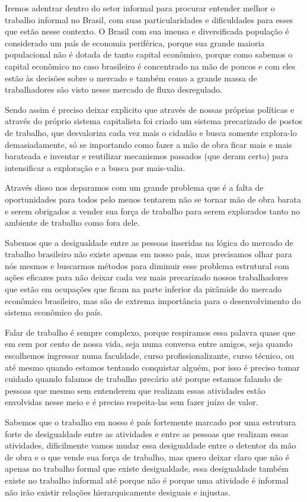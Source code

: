 Iremos adentrar dentro do setor informal para procurar entender melhor o trabalho informal no Brasil, com suas
particularidades e dificuldades para esses que estão nesse contexto. O Brasil com sua imensa e diversificada
população é considerado um país de economia periférica, porque sua grande maioria populacional não é dotada de 
tanto capital econômico, porque como sabemos o capital econômico no caso brasileiro é concentrado na mão de 
poucos e com eles estão às decisões sobre o mercado e também como a grande massa de trabalhadores são visto 
nesse mercado de fluxo desregulado. 

Sendo assim é preciso deixar explicito que através de nossas próprias 
políticas e através do próprio sistema capitalista foi criado um sistema precarizado de postos de trabalho, 
que desvaloriza cada vez mais o cidadão e busca somente explora-lo demasiadamente, só se importando como fazer 
a mão de obra ficar mais e mais barateada e inventar e reutilizar mecanismos passados (que deram certo) para 
intensificar a exploração e a busca por mais-valia. 

Através disso nos deparamos com um grande problema que é 
a falta de oportunidades para todos pelo menos tentarem não se tornar mão de obra barata e serem obrigados a 
vender sua força de trabalho para serem explorados tanto no ambiente de trabalho como fora dele.

Sabemos que a desigualdade entre as pessoas inseridas na lógica do mercado de trabalho brasileiro não existe 
apenas em nosso país, mas precisamos olhar para nós mesmos e buscarmos métodos para diminuir esse problema 
estrutural com ações eficazes para não deixar cada vez mais precarizado nossos trabalhadores que estão em 
ocupações que ficam na parte inferior da pirâmide do mercado econômico brasileiro, mas são de extrema 
importância para o desenvolvimento do sistema econômico do país. 

Falar de trabalho é sempre complexo, porque respiramos essa palavra quase que em cem por cento de nossa vida, 
seja numa conversa entre amigos, seja quando escolhemos ingressar numa faculdade, curso profissionalizante, 
curso técnico, ou até mesmo quando estamos tentando conquistar alguém, por isso é preciso tomar cuidado quando 
falamos de trabalho precário até porque estamos falando de pessoas que mesmo sem entenderem que realizam essas 
atividades estão envolvidas nesse meio e é preciso respeita-las sem fazer juízo de valor.

Sabemos que o trabalho em nosso é país fortemente marcado por uma estrutura forte de desigualdade entre as 
atividades e entre as pessoas que realizam essas atividades, dificilmente vamos mudar essa desigualdade entre 
o detentor da mão de obra e o que vende sua força de trabalho, mas quero deixar claro que não é apenas no 
trabalho formal que existe desigualdade, essa desigualdade também existe no trabalho informal até porque não 
é porque uma atividade é informal não irão existir relações hierarquicamente desiguais e injustas.

